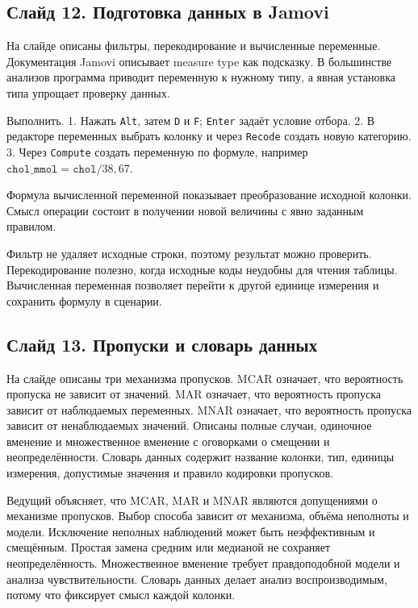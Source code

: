 \documentclass[11pt,a4paper]{article}
\begin{document}
\subsection*{Слайд 12. Подготовка данных в Jamovi}
\begin{onslide}
На слайде описаны фильтры, перекодирование и вычисленные переменные. Документация Jamovi описывает measure type как подсказку. В большинстве анализов программа приводит переменную к нужному типу, а явная установка типа упрощает проверку данных.
\end{onslide}
\begin{jamovi}
Выполнить. 1. Нажать \texttt{Alt}, затем \texttt{D} и \texttt{F}; \texttt{Enter} задаёт условие отбора. 2. В редакторе переменных выбрать колонку и через \texttt{Recode} создать новую категорию. 3. Через \texttt{Compute} создать переменную по формуле, например $\texttt{chol\_mmol}=\texttt{chol}/38{,}67$.\par Формула вычисленной переменной показывает преобразование исходной колонки. Смысл операции состоит в получении новой величины с явно заданным правилом.
\end{jamovi}
Фильтр не удаляет исходные строки, поэтому результат можно проверить. Перекодирование полезно, когда исходные коды неудобны для чтения таблицы. Вычисленная переменная позволяет перейти к другой единице измерения и сохранить формулу в сценарии.

\subsection*{Слайд 13. Пропуски и словарь данных}
\begin{onslide}
На слайде описаны три механизма пропусков. MCAR означает, что вероятность пропуска не зависит от значений. MAR означает, что вероятность пропуска зависит от наблюдаемых переменных. MNAR означает, что вероятность пропуска зависит от ненаблюдаемых значений. Описаны полные случаи, одиночное вменение и множественное вменение с оговорками о смещении и неопределённости. Словарь данных содержит название колонки, тип, единицы измерения, допустимые значения и правило кодировки пропусков.
\end{onslide}
Ведущий объясняет, что MCAR, MAR и MNAR являются допущениями о механизме пропусков. Выбор способа зависит от механизма, объёма неполноты и модели. Исключение неполных наблюдений может быть неэффективным и смещённым. Простая замена средним или медианой не сохраняет неопределённость. Множественное вменение требует правдоподобной модели и анализа чувствительности. Словарь данных делает анализ воспроизводимым, потому что фиксирует смысл каждой колонки.
\end{document}
